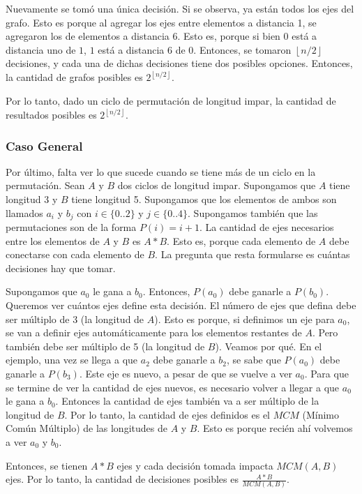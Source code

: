 Nuevamente se tomó una única decisión. Si se observa, ya están todos los ejes del grafo. Esto es porque al agregar los ejes entre elementos a distancia 1, se agregaron los de elementos a distancia 6. Esto es, porque si bien $0$ está a distancia uno de $1$, $1$ está a distancia $6$ de 0. Entonces, se tomaron $\left \lfloor{n/2}\right \rfloor$ decisiones, y cada una de dichas decisiones tiene dos posibles opciones. Entonces, la cantidad de grafos posibles es $2^{\left \lfloor{n/2}\right \rfloor}$.

Por lo tanto, dado un ciclo de permutación de longitud impar, la cantidad de resultados posibles es $2^{\left \lfloor{n/2}\right \rfloor}$.

\subsubsection{Caso General}

Por último, falta ver lo que sucede cuando se tiene más de un ciclo en la permutación. Sean $A$ y $B$ dos ciclos de longitud impar. Supongamos que $A$ tiene longitud 3 y $B$ tiene longitud 5. Supongamos que los elementos de ambos son llamados $a_i$ y $b_j$ con $i \in \{0..2\}$ y $j \in \{0..4\}$. Supongamos también que las permutaciones son de la forma $P(i)=i+1$. La cantidad de ejes necesarios entre los elementos de $A$ y $B$ es $A*B$. Esto es, porque cada elemento de $A$ debe conectarse con cada elemento de $B$. La pregunta que resta formularse es cuántas decisiones hay que tomar.

Supongamos que $a_0$ le gana a $b_0$. Entonces, $P(a_0)$ debe ganarle a $P(b_0)$. Queremos ver cuántos ejes define esta decisión. El número de ejes que defina debe ser múltiplo de 3 (la longitud de $A$). Esto es porque, si definimos un eje para $a_0$, se van a definir ejes automáticamente para los elementos restantes de $A$. Pero también debe ser múltiplo de 5 (la longitud de $B$). Veamos por qué. En el ejemplo, una vez se llega a que $a_2$ debe ganarle a $b_2$, se sabe que $P(a_0)$ debe ganarle a $P(b_3)$. Este eje es nuevo, a pesar de que se vuelve a ver $a_0$. Para que se termine de ver la cantidad de ejes nuevos, es necesario volver a llegar a que $a_0$ le gana a $b_0$. Entonces la cantidad de ejes también va a ser múltiplo de la longitud de $B$. Por lo tanto, la cantidad de ejes definidos es el $MCM$ (Mínimo Común Múltiplo) de las longitudes de $A$ y $B$. Esto es porque recién ahí volvemos a ver $a_0$ y $b_0$.

Entonces, se tienen $A*B$ ejes y cada decisión tomada impacta $MCM(A,B)$ ejes. Por lo tanto, la cantidad de decisiones posibles es $\frac{A*B}{MCM(A,B)}$.

